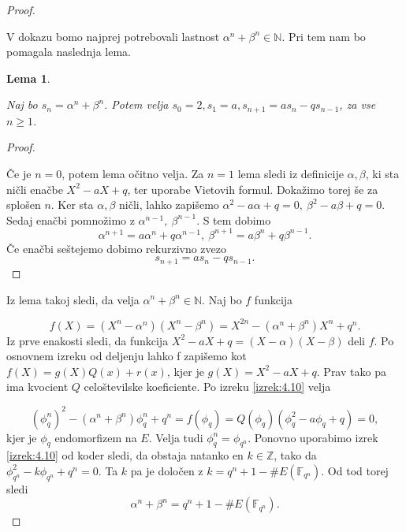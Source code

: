\documentclass[12pt,a4paper,twoside]{article}
\theoremstyle{definition} %
\theoremstyle{plain} %
\newtheorem{lema}[definicija]{Lema}
\numberwithin{equation}{section}  %
\newcommand{\N}{\mathbb N}
\newcommand{\Z}{\mathbb Z}
\newcommand{\F}{\mathbb F}
\newcommand{\E}[1]{E({#1})}
\begin{document}
\begin{proof}~

V dokazu bomo najprej potrebovali lastnost $\alpha^n+\beta^n \in \N$. Pri tem nam bo pomagala naslednja lema.


\begin{lema}~

\label{lema:4.13}
Naj bo $s_n = \alpha^n +  \beta^n$. Potem velja $s_0 = 2,s_1 = a, s_{n+1} = as_n-qs_{n-1}$, za vse $n \geq 1$.

\end{lema}

\begin{proof}~

Če je $n = 0$, potem lema očitno velja. Za $n=1$ lema sledi iz definicije $\alpha,\beta$, ki sta ničli enačbe $X^2-aX+q$, ter uporabe Vietovih formul. Dokažimo torej še za splošen $n$.
Ker sta $\alpha,\beta$ ničli, lahko zapišemo $\alpha^2-a\alpha +q = 0,\  \beta^2-a\beta+q=0$. Sedaj enačbi pomnožimo z $\alpha^{n-1},\ \beta^{n-1}$. S tem dobimo
$$\alpha^{n+1} = a\alpha^n +q\alpha^{n-1},\ \beta^{n+1} = a\beta^n +q\beta^{n-1}.$$
Če enačbi seštejemo dobimo rekurzivno zvezo
$$s_{n+1} = as_n-qs_{n-1}.$$
\end{proof}

Iz lema takoj sledi, da velja $\alpha^n+\beta^n \in \N$. Naj bo $f$ funkcija

$$f(X) = (X^n-\alpha^n)(X^n-\beta^n) = X^{2n}-(\alpha^n+\beta^n)X^n+q^n.$$
Iz prve enakosti sledi, da funkcija $X^2-aX+q = (X-\alpha)(X-\beta)$ deli $f$. Po osnovnem izreku od deljenju lahko f zapišemo kot $f(X) = g(X)Q(x)+r(x)$, kjer je $g(X)= X^2-aX+q$. Prav tako pa ima kvocient $Q$ celoštevilske koeficiente. Po izreku \ref{izrek:4.10} velja

$$(\phi^n_q)^2 -(\alpha^n+\beta^n)\phi^n_q + q^n = f(\phi_q) = Q(\phi_q)(\phi^2_q-a\phi_q+q) = 0,$$
kjer je $\phi_q$ endomorfizem na $E$. Velja tudi $\phi^n_q = \phi_{q^n}$. Ponovno uporabimo izrek \ref{izrek:4.10} od koder sledi, da obstaja natanko en $k \in \Z$, tako da 
$\phi^2_{q^n}-k\phi_{q^n}+q^n=0$. Ta $k$ pa je določen z $k = q^n+1-\#\E{\F_{q^n}}$. Od tod torej sledi
$$\alpha^n+\beta^n = q^n+1-\#\E{\F_{q^n}}.$$

\end{proof}
\end{document}
